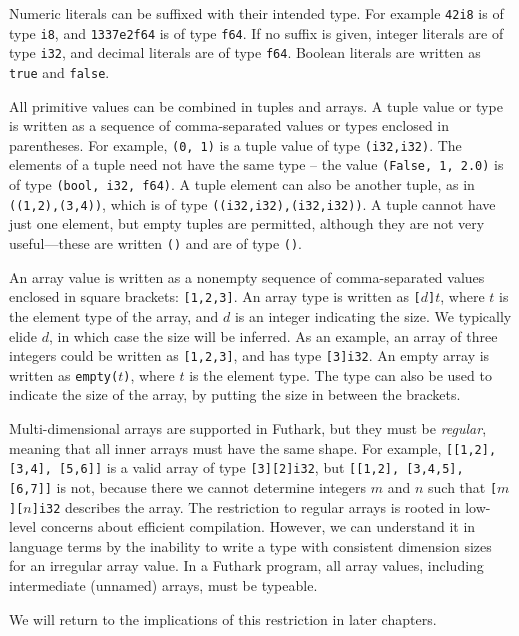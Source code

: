 \documentclass[oneside,11pt]{book}
\begin{document}
Numeric literals can be suffixed with their intended type.  For
example \texttt{42i8} is of type \texttt{i8}, and \texttt{1337e2f64}
is of type \texttt{f64}.  If no suffix is given, integer literals are
of type \texttt{i32}, and decimal literals are of type \texttt{f64}.
Boolean literals are written as \texttt{true} and \texttt{false}.

All primitive values can be combined in tuples and arrays.  A tuple
value or type is written as a sequence of comma-separated values or
types enclosed in parentheses.  For example, \texttt{(0, 1)} is a
tuple value of type \texttt{(i32,i32)}.  The elements of a tuple need
not have the same type -- the value \texttt{(False, 1, 2.0)} is of
type \texttt{(bool, i32, f64)}.  A tuple element can also be another
tuple, as in \texttt{((1,2),(3,4))}, which is of type
\texttt{((i32,i32),(i32,i32))}.  A tuple cannot have just one element,
but empty tuples are permitted, although they are not very useful---these are
written \texttt{()} and are of type \texttt{()}.

An array value is written as a nonempty sequence of comma-separated
values enclosed in square brackets: \texttt{[1,2,3]}.  An array type
is written as \texttt{[$d$]$t$}, where \texttt{$t$} is the element
type of the array, and $d$ is an integer indicating the size.  We
typically elide $d$, in which case the size will be inferred.  As an
example, an array of three integers could be written as
\texttt{[1,2,3]}, and has type \texttt{[3]i32}.  An empty array is
written as \texttt{empty($t$)}, where \texttt{$t$} is the element
type.  The type can also be used to indicate the size of the array, by
putting the size in between the brackets.

Multi-dimensional arrays are supported in Futhark, but they must be
\textit{regular}, meaning that all inner arrays must have the same
shape.  For example, \texttt{[[1,2], [3,4], [5,6]]} is a valid array
of type \texttt{[3][2]i32}, but \texttt{[[1,2], [3,4,5], [6,7]]} is
not, because there we cannot determine integers $m$ and $n$ such that
\texttt{[$m$][$n$]i32} describes the array.  The restriction to
regular arrays is rooted in low-level concerns about efficient
compilation.  However, we can understand it in language terms by the
inability to write a type with consistent dimension sizes for an
irregular array value.  In a Futhark program, all array values,
including intermediate (unnamed) arrays, must be typeable.

We will return to the implications of this restriction in later
chapters.
\end{document}

